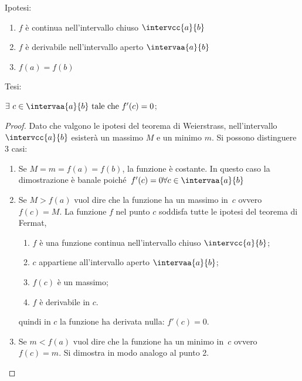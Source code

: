 \vspace*{-35mm}                           %
\begin{minipage}{.54\textwidth}
\noindent Ipotesi:
\begin{enumerate}[nosep]
 \item \(f\) è continua nell'intervallo chiuso \(\intervcc{a}{b}\)
 \item \(f\) è derivabile nell'intervallo aperto \(\intervaa{a}{b}\)
 \item \(f(a)=f(b)\)
\end{enumerate}

\noindent Tesi: 

\(\exists~c \in \intervaa{a}{b} \text{ tale che } f'(c)=0\);
\end{minipage}
\hfill
\begin{minipage}{.42\textwidth}
\begin{center} \trolle \end{center}
\end{minipage}

\vspace{-15mm}                           %
\begin{proof}
Dato che valgono le ipotesi del teorema di Weierstrass, 
nell'intervallo \(\intervcc{a}{b}\) 
esisterà un massimo \(M\) e un minimo \(m\).
Si possono distinguere 3 casi:
\begin{enumerate} %
 \item Se \(M = m = f(a) = f(b)\), la funzione è costante. 
 In questo caso la dimostrazione è banale 
 poiché~\(f'(c)=0 \forall c \in \intervaa{a}{b}\)
 \item Se \(M > f(a)\) vuol dire che la funzione ha un massimo 
 in~\(c\) ovvero~\(f(c)=M\). 
 La funzione \(f\) nel punto \(c\) soddisfa tutte le ipotesi del teorema 
 di Fermat, 
\begin{enumerate}[noitemsep]
 \item \(f\) è una funzione continua nell'intervallo chiuso 
  \(\intervcc{a}{b}\);
 \item \(c\) appartiene all'intervallo aperto \(\intervaa{a}{b}\);
 \item \(f(c)\) è un massimo;
 \item \(f\) è derivabile in \(c\).
\end{enumerate}
 quindi in \(c\) la funzione ha derivata nulla: \(f'(c)=0\).
 \item Se \(m < f(a)\) vuol dire che la funzione ha un minimo 
 in~\(c\) ovvero~\(f(c)=m\).
 Si dimostra in modo analogo al punto 2.
\end{enumerate}
\end{proof}

